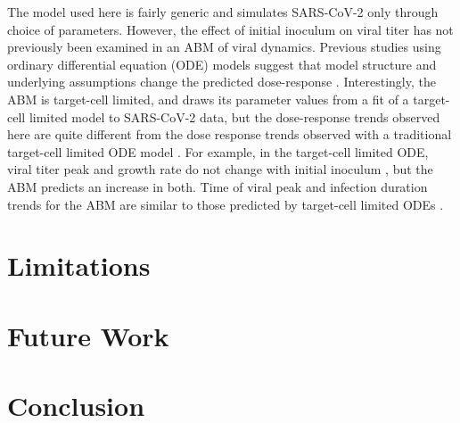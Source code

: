 The model used here is fairly generic and simulates SARS-CoV-2 only through choice of parameters. However, the effect of initial inoculum on viral titer has not previously been examined in an ABM of viral dynamics. Previous studies using ordinary differential equation (ODE) models suggest that model structure and underlying assumptions change the predicted dose-response \citep{wethington19, li14}. Interestingly, the ABM is target-cell limited, and draws its parameter values from a fit of a target-cell limited model to SARS-CoV-2 data, but the dose-response trends observed here are quite different from the dose response trends observed with a traditional target-cell limited ODE model \citep{wethington19,li14}. For example, in the target-cell limited ODE, viral titer peak and growth rate do not change with initial inoculum \citep{wethington19, li14}, but the ABM predicts an increase in both. Time of viral peak and infection duration trends for the ABM are similar to those predicted by target-cell limited ODEs \citep{wethington19, li14}.


\section{Limitations}
\section{Future Work}
\section{Conclusion}

